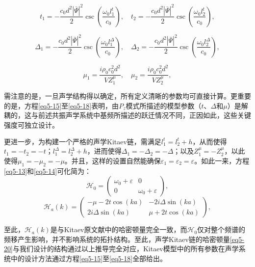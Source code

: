 \begin{equation}\label{eq5-16}
    t_1 = -\frac{c_0d^2|\overline{\Psi}|^2}{2}\csc\left(\frac{\omega_0l_1^t}{c_0}\right), \quad t_2 = -\frac{c_0d^2|\overline{\Psi}|^2}{2}\csc\left(\frac{\omega_0l_2^t}{c_0}\right),
\end{equation}
    
\begin{equation}\label{eq5-17}
    \Delta_1 = -\frac{c_0d^2|\overline{\Psi}|^2}{2}\csc\left(\frac{\omega_0l_1^{\Delta}}{c_0}\right), \quad \Delta_2 = -\frac{c_0d^2|\overline{\Psi}|^2}{2}\csc\left(\frac{\omega_0l_2^{\Delta}}{c_0}\right),
\end{equation}
    
\begin{equation}\label{eq5-18}
    \mu_1 = \frac{i\rho_0c_0^2d^2}{VZ_1^{\mu}}, \quad \mu_2 = \frac{i\rho_0c_0^2d^2}{VZ_2^{\mu}},
\end{equation}

需注意的是，一旦声学结构得以确定，所有定义清晰的参数均可直接计算。更重要的是，方程\ref{eq5-15}至\ref{eq5-18}表明，由$P_z$模式所描述的模型参数（$t$、$\Delta$和$\mu$）是解耦的，这与前述共振声学系统中基频所描述的跃迁情况不同，正因如此，这些关键强度可独立设计。

更进一步，为构建一个严格的声学Kitaev链，需满足$l_1^t = l_2^t + h$，从而使得$t_1 = -t_2 = -t$；$l_1^{\Delta} = l_2^{\Delta} + h$，进而使得$\Delta_1 = -\Delta_2 = -\Delta$；以及$Z_1^{\mu} = -Z_2^{\mu}$，以此使得$\mu_1 = -\mu_2 = -\mu$。并且，这样的设置自然能确保$\varepsilon_1 = \varepsilon_2 = \varepsilon$。如此一来，方程\ref{eq5-13}和\ref{eq5-14}可化简为：
\begin{equation}\label{eq5-19}
    \mathcal{H}_0 = 
    \begin{pmatrix}
    \omega_0 + \varepsilon & 0 \\
    0 & \omega_0 + \varepsilon
    \end{pmatrix},
\end{equation}
\begin{equation}\label{eq5-20}
    \mathcal{H}_a(k) = 
    \begin{pmatrix}
    -\mu - 2t\cos(ka) & -2i\Delta\sin(ka) \\
    2i\Delta\sin(ka) & \mu + 2t\cos(ka)
    \end{pmatrix},
\end{equation}

至此，$\mathcal{H}_a(k)$是与Kitaev原文献中的哈密顿量完全一致\cite{r4}，而$\mathcal{H}_0$仅对整个频谱的频移产生影响，并不影响系统的拓扑结构。至此，声学Kitaev链的哈密顿量\ref{eq5-20}与我们设计的结构通过以上推导完全对应，Kitaev模型中的所有参数在声学系统中的设计方法通过方程\ref{eq5-15}至\ref{eq5-18}全部给出。

